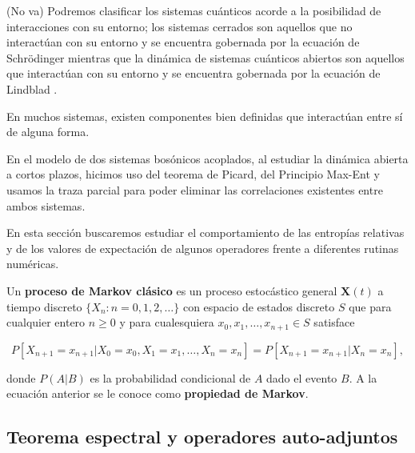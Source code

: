 \begin{Omitir}
{\color{blue}(No va)
Podremos clasificar los sistemas cuánticos acorde a la posibilidad de interacciones con su entorno; los sistemas cerrados son aquellos que no interactúan con su entorno y se encuentra gobernada por la ecuación de Schrödinger\cite{HeinzPetruccione}\cite{Sch35} mientras que la dinámica de sistemas cuánticos abiertos son aquellos que interactúan con su entorno y se encuentra gobernada por la ecuación de Lindblad \cite{HeinzPetruccione}\cite{Lindblad1976}.}

En muchos sistemas, existen componentes bien definidas que interactúan entre sí de alguna forma. 


En el modelo de dos sistemas bosónicos acoplados, al estudiar la dinámica abierta a cortos plazos, hicimos uso del teorema de Picard, del Principio Max-Ent y usamos la traza parcial para poder eliminar las correlaciones existentes entre ambos sistemas. 

En esta sección buscaremos estudiar el comportamiento de las entropías relativas y de los valores de expectación de algunos operadores frente a diferentes rutinas numéricas.
\end{Omitir}



\begin{Omitir}
\begin{definition}

Un \textbf{proceso de Markov clásico} es un proceso estocástico general $\mathbf{X}(t)$ a tiempo discreto $\{X_n : n=0,1,2,\ldots\}$ con espacio de estados discreto $S$ que para cualquier entero $n\geq0$ y para cualesquiera $x_0,x_1,\ldots,x_{n+1} \in S$ satisface

\begin{equation}
    P[X_{n+1} = x_{n+1} |X_0 = x_0, X_1 = x_1, \ldots, X_n = x_n] = P[X_{n+1}=x_{n+1}|X_n = x_n],
    \label{Markov property}
\end{equation}

donde $P(A|B)$ es la probabilidad condicional de $A$ dado el evento $B$. A la ecuación anterior se le conoce como \textbf{propiedad de Markov}.
\end{definition}
\end{Omitir}



\subsection{Teorema espectral y operadores auto-adjuntos}

